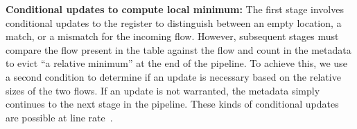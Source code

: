 \noindent \textbf{Conditional updates to compute local minimum:} The first stage involves conditional updates to the register to distinguish between an empty location, a match, or a mismatch for the incoming flow. However, subsequent stages must compare the flow present in the table against the flow and count in the metadata to evict ``a relative minimum'' at the end of the pipeline. To achieve this, we use a second condition to determine if an update is necessary based on the relative sizes of the two flows. %
If an update is not warranted, the metadata simply continues to the next stage in the pipeline. These kinds of conditional updates are possible at line rate~\cite{domino,tpp}.


\iffalse
\begin{figure}[h]

\caption{Second and subsequent stages in our scheme where incoming flow is compared against the flow in the location that it hashes to and a conditional update is made depending on which of the two is larger in size currently; The code is identical to the action block from Stage 1 except that the update to the hsh table (lines 18 - 22) is replaced with the conditional update in this figure}
\label{fig:Stage2P4}
\lstset{numbers=left, numberstyle=\tiny, stepnumber=1, numbersep=5pt, escapechar=`,linewidth=8cm}
\end{figure}
\fi


